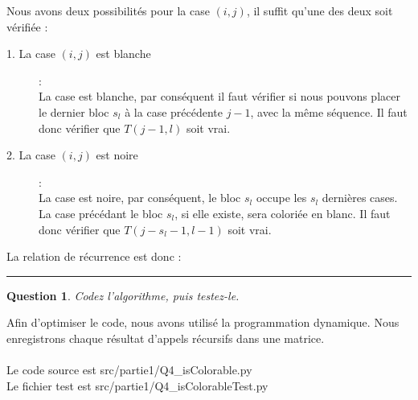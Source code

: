 \documentclass[a4paper,12pt]{article}
\newtheorem{exo}{Question}
\begin{document}
Nous avons deux possibilités pour la case $(i,j)$, il suffit qu'une des deux soit vérifiée :
\begin{description}
	\item[1. La case $(i,j)$ est blanche] :\\
	La case est blanche, par conséquent il faut vérifier si nous pouvons placer le dernier bloc $s_l$ à la case précédente $j-1$, avec la même séquence. Il faut donc vérifier que $T(j-1, l)$ soit vrai.

	\item[2. La case $(i,j)$ est noire] :\\
	La case est noire, par conséquent, le bloc $s_l$ occupe les $s_l$ dernières cases. La case précédant le bloc $s_l$, si elle existe, sera coloriée en blanc. Il faut donc vérifier que $T(j-s_l-1, l-1)$ soit vrai.
\end{description}

La relation de récurrence est  donc : 
\\

\noindent\rule{\textwidth}{1pt}


\begin{exo}
	Codez l'algorithme, puis testez-le.
\end{exo}

Afin d'optimiser le code, nous avons utilisé la programmation dynamique. Nous enregistrons chaque résultat d'appels récursifs dans une matrice.\\\\
Le code source est src/partie1/Q4\_isColorable.py\\
Le fichier test est src/partie1/Q4\_isColorableTest.py\\

\newpage
\end{document}

